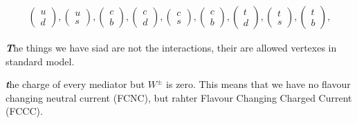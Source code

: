 \documentclass[10pt,a4paper]{article}
\newenvironment{callout}
	{\begin{calloutbox}\color{charcoal}\textbf\textit}
	{\end{calloutbox}}
\begin{document}
\begin{itemize}
               \begin{align*}
                    \begin{pmatrix}
                         u \\ d
                    \end{pmatrix} ,
                    \begin{pmatrix}
                         u \\ s
                    \end{pmatrix} ,
                    \begin{pmatrix}
                         c \\ b
                    \end{pmatrix} ,
                    \begin{pmatrix}
                         c \\ d
                    \end{pmatrix} ,
                    \begin{pmatrix}
                         c \\ s
                    \end{pmatrix} ,
                    \begin{pmatrix}
                         c \\ b
                    \end{pmatrix} ,
                    \begin{pmatrix}
                         t \\ d
                    \end{pmatrix} ,
                    \begin{pmatrix}
                         t \\ s
                    \end{pmatrix} ,
                    \begin{pmatrix}
                         t \\ b
                    \end{pmatrix} ,
               \end{align*}
          \end{itemize}
          \begin{callout}
               The things we have siad are not the interactions, their are allowed vertexes in standard model.
          \end{callout}
          \begin{callout}
               the charge of every mediator but $W^\pm$ is zero. This means that we have no flavour changing neutral current (FCNC), but rahter Flavour Changing Charged Current (FCCC).
          \end{callout}
\end{document}
